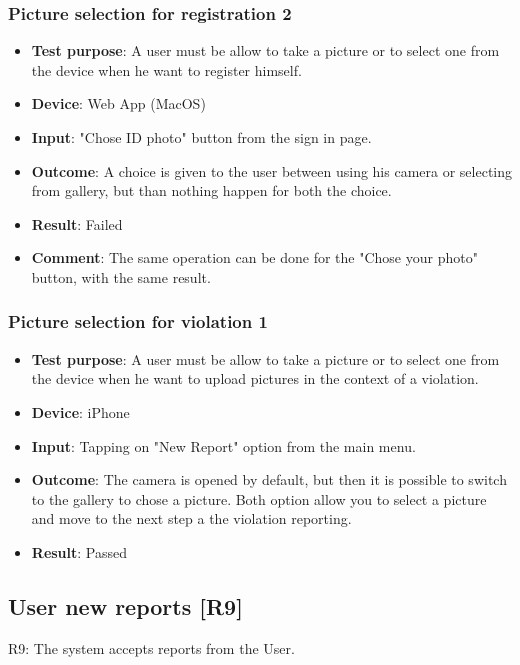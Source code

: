 \documentclass[../ATD.tex]{subfiles}
\begin{document}
    \subsubsection{Picture selection for registration 2}\label{subsubsec:picture-selection-for-registration-2}
    \begin{itemize}
        \item \textbf{Test purpose}: A user must be allow to take a picture or to select one from the device when he want to register himself.
        \item \textbf{Device}: Web App (MacOS)
        \item \textbf{Input}: "Chose ID photo" button from the sign in page.
        \item \textbf{Outcome}: A choice is given to the user between using his camera or selecting from gallery, but than nothing happen for both the choice.
        \item \textbf{Result}: Failed
        \item \textbf{Comment}: The same operation can be done for the "Chose your photo" button, with the same result.
    \end{itemize}

    \subsubsection{Picture selection for violation 1}\label{subsubsec:picture-selection-for-violation-1}
    \begin{itemize}
        \item \textbf{Test purpose}: A user must be allow to take a picture or to select one from the device when he want to upload pictures in the context of a violation.
        \item \textbf{Device}: iPhone
        \item \textbf{Input}: Tapping on "New Report" option from the main menu.
        \item \textbf{Outcome}: The camera is opened by default, but then it is possible to switch to the gallery to chose a picture.
        Both option allow you to select a picture and move to the next step a the violation reporting.
        \item \textbf{Result}: Passed
    \end{itemize}

    \subsection{User new reports [R9]}\label{subsec:user-new-report}
    R9: The system accepts reports from the User.
\end{document}
